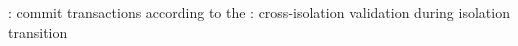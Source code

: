 
\begin{frame}{}
	\begin{center}
	\end{center}
\end{frame}


\begin{frame}{}
	\begin{center}
		: commit transactions according to the 
		: cross-isolation validation during isolation transition
	\end{center}
\end{frame}


